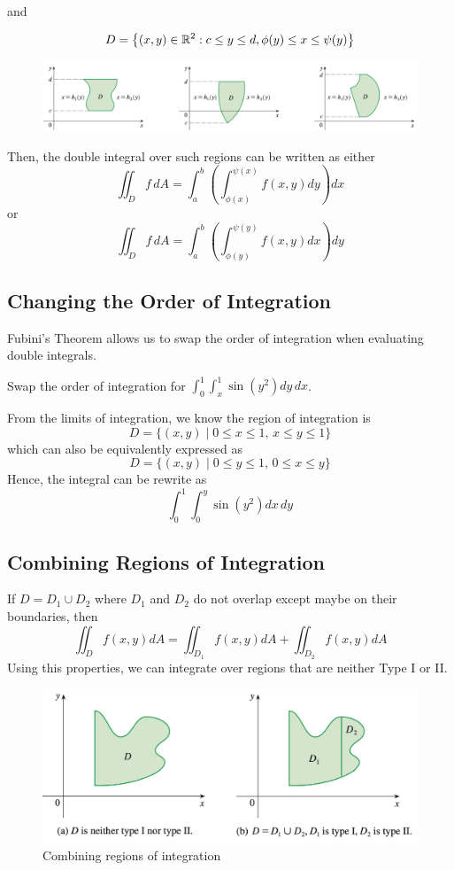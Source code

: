 and

$$
D = \left\{(x,y)\in {\mathbb R}^2 : c\le y \le d, \phi(y) \le x \le \psi(y)\right\}
$$
\begin{figure}[h]
    \centering
    \includegraphics[width=\linewidth]{figures/type2-gen-region.png}
\end{figure}

Then, the double integral over such regions can be written as either
$$
\iint_D f\, dA =  \int_a^b \left( \int_{\phi(x)}^{\psi(x)} f(x,y) dy\right)dx
$$
or
$$
\iint_D f\, dA =  \int_a^b  \left( \int_{\phi(y)}^{\psi(y)}  f(x,y) dx\right)dy
$$

\subsection{Changing the Order of Integration}

Fubini's Theorem allows us to swap the order of integration when evaluating double integrals.

\begin{example}
Swap the order of integration for $\int_0^1 \int_x^1 \sin(y^2)dy\, dx$.

From the limits of integration, we know the region of integration is
$$
D = \{ (x,y) \mid 0 \leq x \leq 1,\, x \leq y \leq 1 \}
$$
which can also be equivalently expressed as
$$
D = \{ (x,y) \mid 0 \leq y \leq 1,\, 0 \leq x \leq y \}
$$
Hence, the integral can be rewrite as
$$
\int_0^1 \int_0^y \sin(y^2) dx\, dy
$$
\end{example}

\subsection{Combining Regions of Integration}
If $D = D_1 \cup D_2$ where $D_1$ and $D_2$ do not overlap except maybe on their boundaries, then
$$
\iint_D f(x,y) dA = \iint_{D_1} f(x,y) dA + \iint_{D_2} f(x,y) dA
$$
Using this properties, we can integrate over regions that are neither Type I or II.
\begin{figure}[h]
    \centering
    \includegraphics[width=0.7\linewidth]{figures/combine-region.png}
    \caption{Combining regions of integration}
    \label{fig:combine_regions}
\end{figure}

